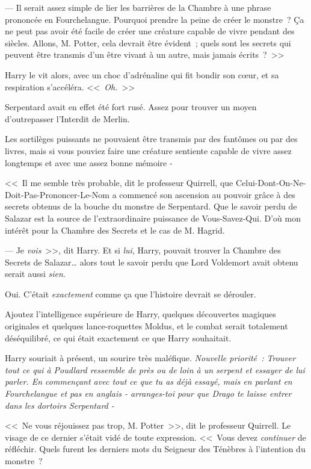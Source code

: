 --- Il serait assez simple de lier les barrières de la Chambre à une phrase prononcée en Fourchelangue. Pourquoi prendre la peine de créer le monstre~? Ça ne peut pas avoir été facile de créer une créature capable de vivre pendant des siècles. Allons, M. Potter, cela devrait être évident~; quels sont les secrets qui peuvent être transmis d'un être vivant à un autre, mais jamais écrits~?~>>

Harry le vit alors, avec un choc d'adrénaline qui fit bondir son cœur, et sa respiration s'accéléra. <<~\emph{Oh.}~>>

Serpentard avait en effet été fort rusé. Assez pour trouver un moyen d'outrepasser l'Interdit de Merlin.

Les sortilèges puissants ne pouvaient être transmis par des fantômes ou par des livres, mais si vous pouviez faire une créature sentiente capable de vivre assez longtemps et avec une assez bonne mémoire -

<<~Il me semble très probable, dit le professeur Quirrell, que Celui-Dont-On-Ne-Doit-Pas-Prononcer-Le-Nom a commencé son ascension au pouvoir grâce à des secrets obtenus de la bouche du monstre de Serpentard. Que le savoir perdu de Salazar est la source de l'extraordinaire puissance de Vous-Savez-Qui. D'où mon intérêt pour la Chambre des Secrets et le cas de M. Hagrid.

--- Je \emph{vois}~>>, dit Harry. Et si \emph{lui}, Harry, pouvait trouver la Chambre des Secrets de Salazar… alors tout le savoir perdu que Lord Voldemort avait obtenu serait aussi \emph{sien}.

Oui. C'était \emph{exactement} comme ça que l'histoire devrait se dérouler.

Ajoutez l'intelligence supérieure de Harry, quelques découvertes magiques originales et quelques lance-roquettes Moldus, et le combat serait totalement déséquilibré, ce qui était exactement ce que Harry souhaitait.

Harry souriait à présent, un sourire très maléfique. \emph{Nouvelle priorité~: Trouver tout ce qui à Poudlard ressemble de près ou de loin à un serpent et essayer de lui parler. En commençant avec tout ce que tu as déjà essayé, mais en parlant en Fourchelangue et pas en anglais - arranges-toi pour que Drago te laisse entrer dans les dortoirs Serpentard -}

<<~Ne vous réjouissez pas trop, M. Potter~>>, dit le professeur Quirrell. Le visage de ce dernier s'était vidé de toute expression. <<~Vous devez \emph{continuer} de réfléchir. Quels furent les derniers mots du Seigneur des Ténèbres à l'intention du monstre~?

